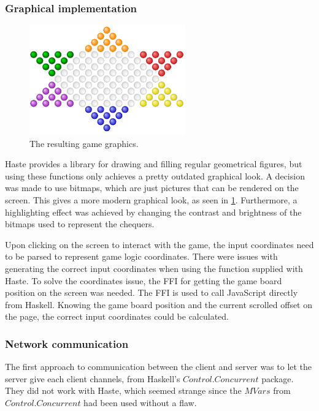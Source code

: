 \documentclass[a4paper]{article}
\begin{document}
\subsubsection{Graphical implementation}
\label{sec:graphimpl}

\begin{figure}[ht!]
    \centering
    \includegraphics[scale=0.8,width=0.6\textwidth]{figure/game}
    \caption{The resulting game graphics.}
    \label{fig:gameGraphics}
\end{figure}


Haste provides a library for drawing and filling regular geometrical figures, but using these functions only achieves a pretty outdated graphical look. A decision was made to use bitmaps, which are just pictures that can be rendered on the screen. This gives a more modern graphical look, as seen in \cref{fig:gameGraphics}. 
Furthermore, a highlighting effect was achieved by changing the contrast and brightness of the bitmaps used to represent the chequers.

Upon clicking on the screen to interact with the game, the input coordinates need to be parsed to represent game logic coordinates. There were issues with generating the correct input coordinates when using the function supplied with Haste. To solve the coordinates issue, the FFI for getting the game board position on the screen was needed. The FFI is used to call JavaScript directly from Haskell. Knowing the game board position and the current scrolled offset on the page, the correct input coordinates could be calculated. 


\subsubsection{Network communication}
The first approach to communication between the client and server was to let the server give each client channels, from Haskell's $Control.Concurrent$ package. They did not work with Haste, which seemed strange since the $MVars$ from $Control.Concurrent$ had been used without a flaw.
\end{document}
